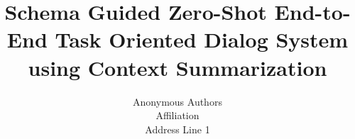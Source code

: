 \documentclass[letterpaper]{article}
\title{Schema Guided Zero-Shot End-to-End Task Oriented Dialog System using Context Summarization}
\author{Anonymous Authors\\
    Affiliation\\
    Address Line 1\\
}
\begin{document}
\maketitle
\begin{abstract}
    \begin{quote}
        
    \end{quote}
\end{abstract}









\end{document}
